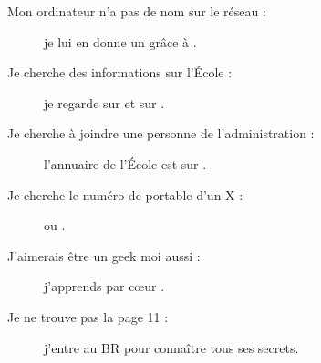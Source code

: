\begin{description}
\item[Mon ordinateur n'a pas de nom sur le réseau : ] je lui en donne un gr\^ace \`a  .

\item[Je cherche des informations sur l'\'Ecole : ] je regarde sur  et sur .

\item[Je cherche à joindre une personne de l'administration : ] l'annuaire de l'École est sur \linebreak{} .

\item[Je cherche le numéro de portable d'un X : ] \fkz ou .

\item[J'aimerais être un geek moi aussi : ] j'apprends par c\oe ur .

\item[Je ne trouve pas la page 11 : ] j'entre au BR pour connaître tous ses secrets.

\end{description}
